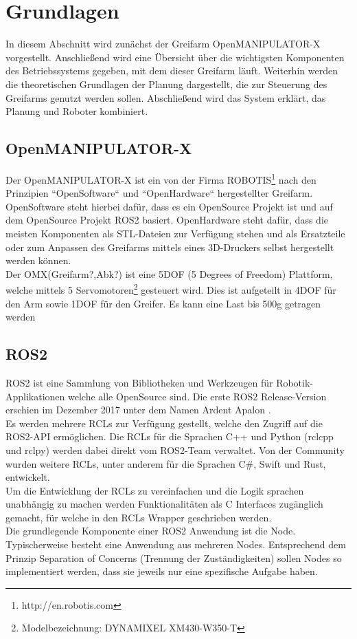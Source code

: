\section {Grundlagen}
In diesem Abschnitt wird zunächst der Greifarm OpenMANIPULATOR-X vorgestellt.
Anschließend wird eine Übersicht über die wichtigsten Komponenten des Betriebssystems gegeben, mit dem dieser Greifarm läuft.
Weiterhin werden die theoretischen Grundlagen der Planung dargestellt, die zur Steuerung des Greifarms genutzt werden sollen.
Abschließend wird das System erklärt, das Planung und Roboter kombiniert.
\subsection{OpenMANIPULATOR-X}
Der OpenMANIPULATOR-X ist ein von der Firma ROBOTIS{\footnote{http://en.robotis.com}} nach den Prinzipien ``OpenSoftware`` und ``OpenHardware`` hergestellter Greifarm.
OpenSoftware steht hierbei dafür, dass es ein OpenSource Projekt ist und auf dem OpenSource Projekt \ac{ROS2} basiert.
OpenHardware steht dafür, dass die meisten Komponenten als STL-Dateien zur Verfügung stehen und als Ersatzteile oder zum Anpassen des Greifarms mittels eines 3D-Druckers selbst hergestellt werden können.\\
Der OMX(Greifarm?,Abk?) ist eine 5DOF (5 Degrees of Freedom) Plattform, welche mittels 5 Servomotoren{\footnote{Modelbezeichnung: DYNAMIXEL XM430-W350-T}} gesteuert wird.
Dies ist aufgeteilt in 4DOF für den Arm sowie 1DOF für den Greifer.
Es kann eine Last bis 500g getragen werden
\subsection{ROS2}
\ac{ROS2} ist eine Sammlung von Bibliotheken und Werkzeugen für Robotik-Applikationen welche alle OpenSource sind.
Die erste \ac{ROS2} Release-Version erschien im Dezember 2017 unter dem Namen Ardent Apalon \citet{ros2docs}.\\
Es werden  mehrere \acp{RCL}  zur Verfügung gestellt, welche den Zugriff auf die \ac{ROS2}-API ermöglichen.
Die \acp{RCL} für die Sprachen C++ und Python (rclcpp und rclpy) werden dabei direkt vom \ac{ROS2}-Team verwaltet.
Von der Community wurden weitere \acp{RCL}, unter anderem für die Sprachen C\#, Swift und Rust, entwickelt.\\
Um die Entwicklung der \acp{RCL} zu vereinfachen und die Logik sprachen unabhängig zu machen werden Funktionalitäten als C Interfaces zugänglich gemacht, für welche in den \acp{RCL} Wrapper geschrieben werden.\\
Die grundlegende Komponente einer \ac{ROS2} Anwendung ist die Node.
Typischerweise besteht eine Anwendung aus mehreren Nodes.
Entsprechend dem Prinzip Separation of Concerns (Trennung der Zuständigkeiten) sollen Nodes so implementiert werden, dass sie jeweils nur eine spezifische Aufgabe haben.
